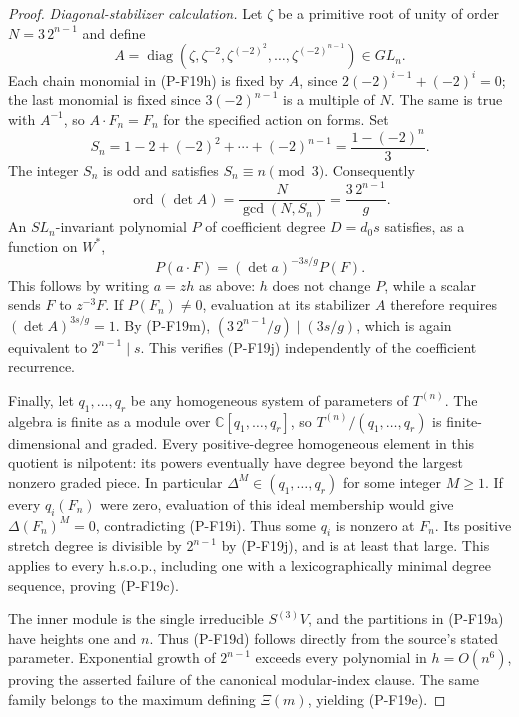 \documentclass[11pt,a4paper]{article}
\begin{document}
\begin{proof}
\emph{Diagonal-stabilizer calculation.}
Let $\zeta$ be a primitive root of unity of order $N=3\,2^{n-1}$
and define
\[
 A=\operatorname{diag}
  (\zeta,\zeta^{-2},\zeta^{(-2)^2},\ldots,
                         \zeta^{(-2)^{n-1}})\in GL_n.
\]
Each chain monomial in (P-F19h) is fixed by $A$, since
$2(-2)^{i-1}+(-2)^i=0$; the last monomial is fixed since
$3(-2)^{n-1}$ is a multiple of $N$. The same is true with
$A^{-1}$, so $A\cdot F_n=F_n$ for the specified action on forms.
Set
\[
 S_n=1-2+(-2)^2+\cdots+(-2)^{n-1}
     =\frac{1-(-2)^n}{3}.
\]
The integer $S_n$ is odd and satisfies $S_n\equiv n\pmod3$.
Consequently
\[
 \operatorname{ord}(\det A)
 =\frac{N}{\gcd(N,S_n)}
 =\frac{3\,2^{n-1}}{g}.
 \tag{P-F19m}
\]
An $SL_n$-invariant polynomial $P$ of coefficient degree
$D=d_0s$ satisfies, as a function on $W^*$,
\[
 P(a\cdot F)=(\det a)^{-3s/g}P(F).
 \tag{P-F19n}
\]
This follows by writing $a=zh$ as above: $h$ does not change
$P$, while a scalar sends $F$ to $z^{-3}F$.
If $P(F_n)\ne0$, evaluation at its stabilizer $A$ therefore
requires $(\det A)^{3s/g}=1$. By (P-F19m),
$(3\,2^{n-1}/g)\mid(3s/g)$, which is again equivalent to
$2^{n-1}\mid s$. This verifies (P-F19j) independently of
the coefficient recurrence.

Finally, let $q_1,\ldots,q_r$ be any homogeneous system of
parameters of $T^{(n)}$. The algebra is finite as a module over
$\mathbb C[q_1,\ldots,q_r]$, so
$T^{(n)}/(q_1,\ldots,q_r)$ is finite-dimensional and graded.
Every positive-degree homogeneous element in this quotient is
nilpotent: its powers eventually have degree beyond the largest
nonzero graded piece. In particular
$\Delta^M\in(q_1,\ldots,q_r)$ for some integer $M\ge1$.
If every $q_i(F_n)$ were zero, evaluation of this ideal membership
would give $\Delta(F_n)^M=0$, contradicting (P-F19i).
Thus some $q_i$ is nonzero at $F_n$. Its positive stretch degree
is divisible by $2^{n-1}$ by (P-F19j), and is at least that
large. This applies to every h.s.o.p., including one with a
lexicographically minimal degree sequence, proving (P-F19c).

The inner module is the single irreducible $S^{(3)}V$, and
the partitions in (P-F19a) have heights one and $n$.
Thus (P-F19d) follows directly from the source's stated
parameter. Exponential growth of $2^{n-1}$ exceeds every
polynomial in $h=O(n^6)$, proving the asserted failure of the
canonical modular-index clause. The same family belongs to the
maximum defining $\Xi(m)$, yielding (P-F19e).
\end{proof}
\end{document}
